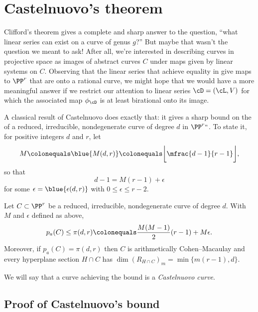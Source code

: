  \section{Castelnuovo's theorem}\label{CastelnuovoSection}

Clifford's theorem gives a complete and sharp answer to the question,
%
``what linear series can exist on a curve of genus $g$?''
But maybe that wasn't the question we meant to ask! After all, we're
interested in describing curves in projective space as images of abstract
curves $C$ under maps given by linear systems on $C$. Observing that
the linear series that achieve equality in 
%
give maps
to $\PP^r$ that are 
onto a rational curve, we might hope that we
would have a 
more meaningful answer if we
restrict our attention to linear series $\cD = (\cL,V)$ for which the
%
associated map $\phi_\cD$ is at least  birational onto its image.

A classical result of Castelnuovo does exactly that: it gives a sharp
bound on the 
%
of a reduced, irreducible, nondegenerate
curve of degree $d$ in $\PP^r` `$. To state it, for positive integers $d$
and $r$, let
%
$$
M \colonequals  
\blue{M(d,r)}
\colonequals  
\biggl\lfloor\mfrac{d-1}{r-1}\biggr\rfloor,
$$
so that
$$
 d -1 = M(r-1) + \epsilon
$$ 
for some $\epsilon = 
\blue{\epsilon(d,r)}
$
 with $0 \leq \epsilon \leq r-2$.
%

\begin{theorem}\label{Castelnuovo's bound}
Let $C \subset \PP^r$ be a reduced, irreducible, nondegenerate curve of
%
degree $d$. With $M$ and $\epsilon$ defined
as above,
$$
p_a(C) \leq \pi(d,r) \colonequals  \frac{M(M-1)}{2}(r-1) + M\epsilon.
$$
Moreover, if $p_a(C) = \pi(d,r)$  then $C$ is arithmetically
%
Cohen--Macaulay and every hyperplane
section $H\cap C$ has 
%
$
\dim (R_{H\cap C})_{m} = \min\{m(r-1), d\}.
$
\end{theorem}

We will say that a curve achieving the bound is a \emph{Castelnuovo
%
curve}.

\subsection*{Proof of Castelnuovo's bound}

